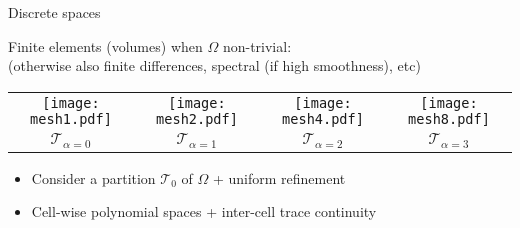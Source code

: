 \def\mesh{\mathcal{T}}
\begin{frame}{Discrete spaces}


  \begin{overprint}

%
%
%
%
%
%
    Finite elements (volumes) when $\Omega$ non-trivial: \\
    {\footnotesize (otherwise also finite differences, spectral (if high smoothness), etc)}

    \vspace{0.2cm}

    \begin{tabular}{cccc}
      \texttt{[image: mesh1.pdf]} &
      \texttt{[image: mesh2.pdf]} &
      \texttt{[image: mesh4.pdf]} &
      \texttt{[image: mesh8.pdf]} \\
      $\mesh_{\alpha=0}$ &
      $\mesh_{\alpha=1}$ &
      $\mesh_{\alpha=2}$ &
      $\mesh_{\alpha=3}$
    \end{tabular}

    \begin{itemize}

      \item Consider a partition $\mesh_0$ of $\Omega$ + uniform refinement

      \item Cell-wise polynomial spaces + inter-cell trace continuity


    \end{itemize}


\end{overprint}
\end{frame}
